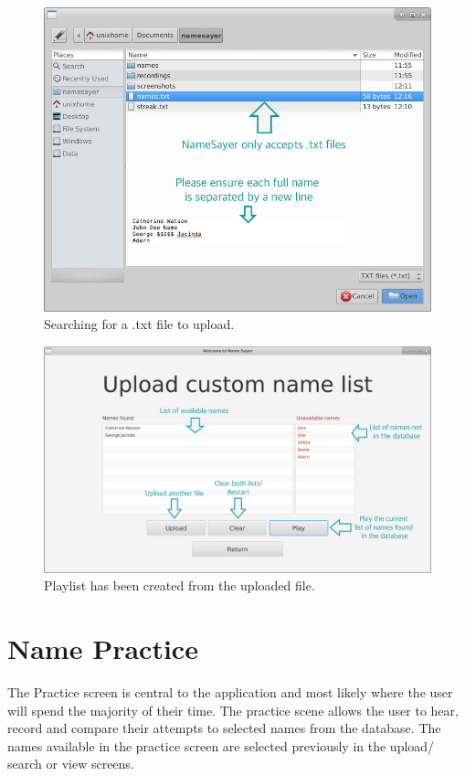 \documentclass{article}
\begin{document}
\begin{figure}[H]
	\includegraphics[width=\textwidth]{images/6_upload_filesystem.jpg}
	\caption{Searching for a .txt file to upload.}
	\label{uploadfilesystem}
\end{figure}

\begin{figure}[H]
	\includegraphics[width=\textwidth]{images/7_upload_populated.jpg}
	\caption{Playlist has been created from the uploaded file.}
	\label{uploadpopulated}
\end{figure}

\section{Name Practice}
The Practice screen is central to the application and most likely where the user
will spend the majority of their time. The practice scene allows the user to
hear, record and compare their attempts to selected names from the database. The
names available  in the practice screen are selected previously in the upload/
search or view screens.
\end{document}
